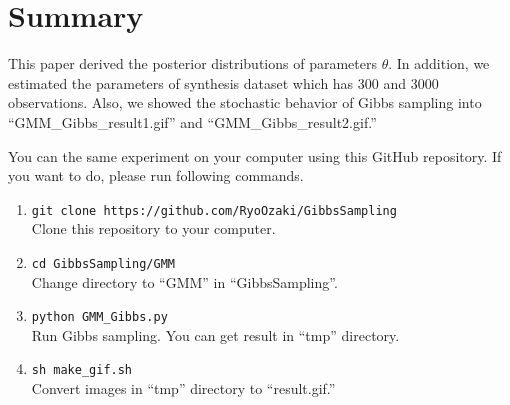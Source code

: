 \documentclass[a4paper]{article}
\begin{document}
\newpage
\section{Summary}
This paper derived the posterior distributions of parameters $\theta$.
In addition, we estimated the parameters of synthesis dataset which has 300 and 3000 observations.
Also, we showed the stochastic behavior of Gibbs sampling into ``GMM\_Gibbs\_result1.gif'' and ``GMM\_Gibbs\_result2.gif.''

You can the same experiment on your computer using this GitHub repository.
If you want to do, please run following commands.
\begin{enumerate}
	\item \verb|git clone https://github.com/RyoOzaki/GibbsSampling|\\
		Clone this repository to your computer.
	\item \verb|cd GibbsSampling/GMM|\\
		Change directory to ``GMM'' in ``GibbsSampling''.
	\item \verb|python GMM_Gibbs.py|\\
		Run Gibbs sampling. You can get result in ``tmp'' directory.
	\item \verb|sh make_gif.sh|\\
		Convert images in ``tmp'' directory to ``result.gif.''
\end{enumerate}
\end{document}
